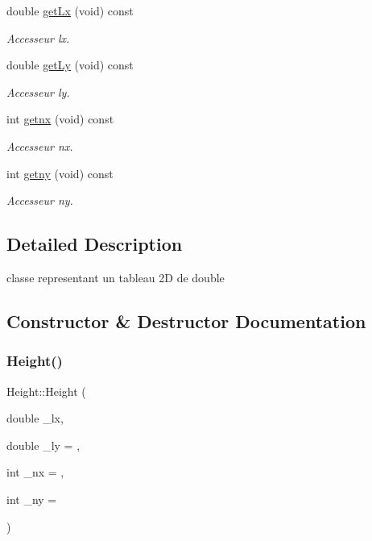 \begin{DoxyCompactItemize}
double \hyperlink{class_height_aaa081f8f3456675762b3d74ded8ea026}{get\+Lx} (void) const
\begin{DoxyCompactList}\small\item\em Accesseur lx. \end{DoxyCompactList}\item 
\hypertarget{class_height_acd15b8e55b68db36661a07c849ff7be1}{}\label{class_height_acd15b8e55b68db36661a07c849ff7be1} 
double \hyperlink{class_height_acd15b8e55b68db36661a07c849ff7be1}{get\+Ly} (void) const
\begin{DoxyCompactList}\small\item\em Accesseur ly. \end{DoxyCompactList}\item 
\hypertarget{class_height_a44f3f951bdf0dbae9a34b1bb43ad4aa6}{}\label{class_height_a44f3f951bdf0dbae9a34b1bb43ad4aa6} 
int \hyperlink{class_height_a44f3f951bdf0dbae9a34b1bb43ad4aa6}{getnx} (void) const
\begin{DoxyCompactList}\small\item\em Accesseur nx. \end{DoxyCompactList}\item 
\hypertarget{class_height_ab5f469a1458efc563530ebd5321a25f9}{}\label{class_height_ab5f469a1458efc563530ebd5321a25f9} 
int \hyperlink{class_height_ab5f469a1458efc563530ebd5321a25f9}{getny} (void) const
\begin{DoxyCompactList}\small\item\em Accesseur ny. \end{DoxyCompactList}\end{DoxyCompactItemize}


\subsection{Detailed Description}
classe representant un tableau 2D de double 

\subsection{Constructor \& Destructor Documentation}
\hypertarget{class_height_ae7df55c82f2a3fbe8e1379c4dd003eef}{}\label{class_height_ae7df55c82f2a3fbe8e1379c4dd003eef} 
\subsubsection{\texorpdfstring{Height()}{Height()}}
{\footnotesize\ttfamily Height\+::\+Height (\begin{DoxyParamCaption}\item[{double}]{\+\_\+lx,  }\item[{double}]{\+\_\+ly = {},  }\item[{int}]{\+\_\+nx = {},  }\item[{int}]{\+\_\+ny = {} }\end{DoxyParamCaption})}



